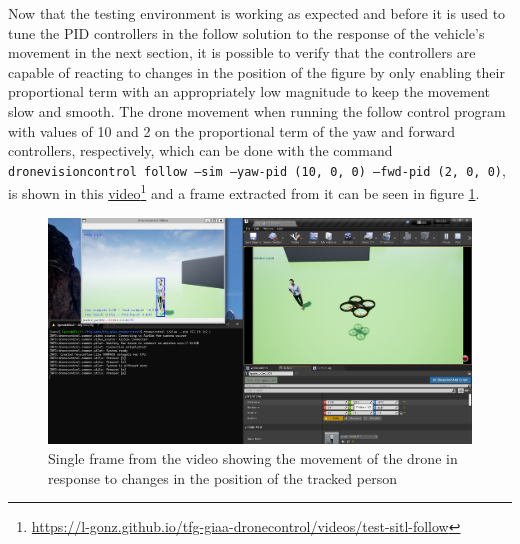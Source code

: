 Now that the testing environment is working as expected and before it is used to tune the PID controllers in the follow solution to the response of the vehicle's movement in the next section, it is possible to verify that the controllers are capable of reacting to changes in the position of the figure by only enabling their proportional term with an appropriately low magnitude to keep the movement slow and smooth.
The drone movement when running the follow control program with values of 10 and 2 on the proportional term of the yaw and forward controllers, respectively, which can be done with the command \texttt{dronevisioncontrol follow --sim --yaw-pid (10, 0, 0) --fwd-pid (2, 0, 0)}, is shown in this \href{https://l-gonz.github.io/tfg-giaa-dronecontrol/videos/test-sitl-follow}{video}\footnote{\url{https://l-gonz.github.io/tfg-giaa-dronecontrol/videos/test-sitl-follow}} and a frame extracted from it can be seen in figure \ref{fig:airsim-test-follow}.

\begin{figure}
  \centering
  \includegraphics[width=\textwidth, keepaspectratio]{img/video-follow-sitl.png}
  \caption{Single frame from the video showing the movement of the drone in response to changes in the position of the tracked person}
  \label{fig:airsim-test-follow}
\end{figure}
